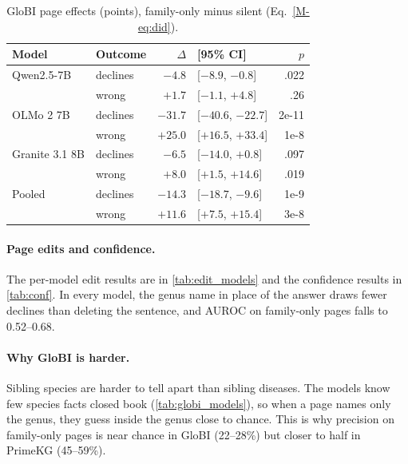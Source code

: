 \begin{table}[t]
\centering
\footnotesize
\setlength{\tabcolsep}{2.4pt}
\begin{tabular}{@{}llrlr@{}}
\toprule
Model & Outcome & $\Delta$ & [95\% CI] & $p$ \\
\midrule
Qwen2.5-7B & declines & $-4.8$ & [$-8.9$, $-0.8$] & .022 \\
 & wrong & $+1.7$ & [$-1.1$, $+4.8$] & .26 \\
OLMo 2 7B & declines & $-31.7$ & [$-40.6$, $-22.7$] & 2e-11 \\
 & wrong & $+25.0$ & [$+16.5$, $+33.4$] & 1e-8 \\
Granite 3.1 8B & declines & $-6.5$ & [$-14.0$, $+0.8$] & .097 \\
 & wrong & $+8.0$ & [$+1.5$, $+14.6$] & .019 \\
\midrule
Pooled & declines & $-14.3$ & [$-18.7$, $-9.6$] & 1e-9 \\
 & wrong & $+11.6$ & [$+7.5$, $+15.4$] & 3e-8 \\
\bottomrule
\end{tabular}
\caption{GloBI page effects (points), family-only minus silent (Eq.~\ref{M-eq:did}).}
\label{tab:globi_did}
\end{table}

\paragraph{Page edits and confidence.}
The per-model edit results are in \cref{tab:edit_models} and the confidence results in \cref{tab:conf}. In every model, the genus name in place of the answer draws fewer declines than deleting the sentence, and AUROC on family-only pages falls to 0.52--0.68.

\paragraph{Why GloBI is harder.}
Sibling species are harder to tell apart than sibling diseases. The models know few species facts closed book (\cref{tab:globi_models}), so when a page names only the genus, they guess inside the genus close to chance. This is why precision on family-only pages is near chance in GloBI (22--28\%) but closer to half in PrimeKG (45--59\%).
